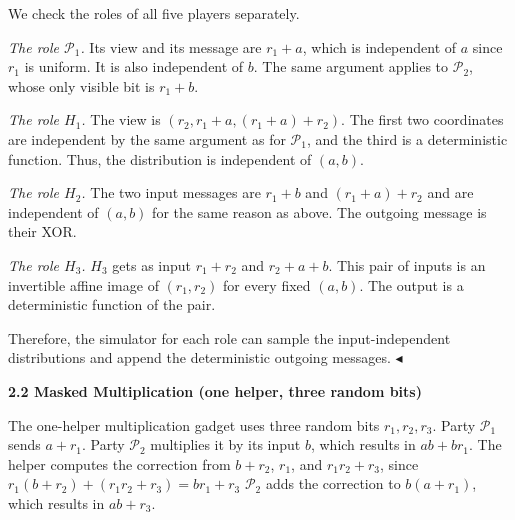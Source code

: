 We check the roles of all five players separately.\par




\emph{The role $\mathcal{P}_{1}$.}
Its view and its message are $r_{1}+a$, which is independent of $a$ since $r_{1}$ is uniform. It is also independent of $b$. The same argument applies to $\mathcal{P}_{2}$, whose only visible bit is $r_{1}+b$.\par




\emph{The role $H_{1}$.}
The view is $(r_{2},r_{1}+a,(r_{1}+a)+r_{2})$. The first two coordinates are independent by the same argument as for $\mathcal{P}_{1}$, and the third is a deterministic function. Thus, the distribution is independent of $(a,b)$.\par




\emph{The role $H_{2}$.}
The two input messages are $r_{1}+b$ and $(r_{1}+a)+r_{2}$ and are independent of
$(a,b)$ for the same reason as above. The outgoing message is their XOR.\par




\emph{The role $H_{3}$.}
$H_{3}$ gets as input $r_{1}+r_{2}$ and $r_{2}+a+b$. This pair of inputs is an invertible affine image of $(r_{1},r_{2})$ for every fixed $(a,b)$. The output is a deterministic function of the pair.\par




Therefore, the simulator for each role can sample the input-independent distributions and append the deterministic outgoing messages.
$\blacktriangleleft$\par






\par\medskip\noindent\textbf{
2.2 Masked Multiplication (one helper, three random bits)}\par




The one-helper multiplication gadget uses three random bits $r_{1},r_{2},r_{3}$. Party $\mathcal{P}_{1}$ sends $a+r_{1}$. Party $\mathcal{P}_{2}$ multiplies it by its input $b$, which results in $ab+br_{1}$. The helper computes the correction from $b+r_{2}$, $r_{1}$, and $r_{1}r_{2}+r_{3}$, since
$r_{1}(b+r_{2})+(r_{1}r_{2}+r_{3})=br_{1}+r_{3}$
$\mathcal{P}_{2}$ adds the correction to $b(a+r_{1})$, which results in $ab+r_{3}$.\par




